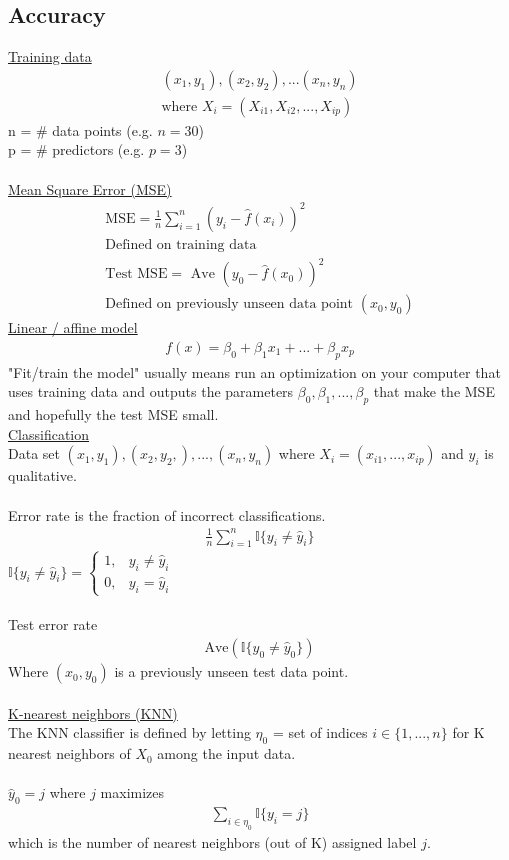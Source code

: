 \documentclass[12pt, letterpaper]{article}
\begin{document}
\subsection{Accuracy}
\underline{Training data} 
\begin{align*}
    (x_1, y_1),(x_2, y_2),...(x_n, y_n) \\ 
    \text{where } X_i = (X_{i1}, X_{i2}, ... , X_{ip})
\end{align*}
n = \# data points (e.g. $n=30$) \\
p = \# predictors (e.g. $p=3$) \\ \\
\noindent \underline{Mean Square Error (MSE)}
\begin{align*}
    \text{MSE} = \frac 1n \sum_{i=1}^{n} (y_i - \hat{f}(x_i))^2 \\
    \text{Defined on training data} \\ 
    \text{Test MSE} = \text{ Ave } (y_0 - \hat{f}(x_0))^2 \\ 
    \text{Defined on previously unseen data point } (x_0, y_0)
\end{align*}
\underline{Linear / affine model}
\begin{align*}
    f(x) = \beta_0 + \beta_1x_1 + ... + \beta_px_p
\end{align*}
"Fit/train the model" usually means run an optimization on your computer
that uses training data and outputs the parameters $\beta_0, \beta_1,...,\beta_p$ that make the 
MSE and hopefully the test MSE small. \\

\noindent \underline{Classification} \\ 
Data set $(x_1,y_1),(x_2,y_2,),..., (x_n,y_n)$ where $X_i=(x_{i1},...,x_{ip})$ and $y_i$ is qualitative. \\ \\ 
Error rate is the fraction of incorrect classifications. 
\begin{align*}
    \frac 1n \sum_{i=1}^{n} \mathbb{I} \{y_i \ne \hat{y}_i\}
\end{align*}
$\mathbb{I}\{ y_i \ne \hat{y}_i \} = \begin{cases}
    1, & y_i \ne \hat y_i \\
    0, & y_i = \hat y_i 
\end{cases}$ \\ \\
Test error rate 
\begin{align*}
    \text{Ave}(\mathbb{I} \{ y_0 \ne \hat y_0 \})
\end{align*}
Where $(x_0,y_0)$ is a previously unseen test data point. \\ \\
\underline{K-nearest neighbors (KNN)} \\ 
The KNN classifier is defined by letting $\eta_0$ = set of indices $i\in\{ 1,...,n \}$ for K nearest neighbors of $X_0$ among the input data. \\\\
$\hat y_0 = j$ where $j$ maximizes 
\begin{align*}
    \sum_{i\in \eta_0}^{} \mathbb{I} \{y_i=j\}
\end{align*}
which is the number of nearest neighbors (out of K) assigned label $j$.
\end{document}
